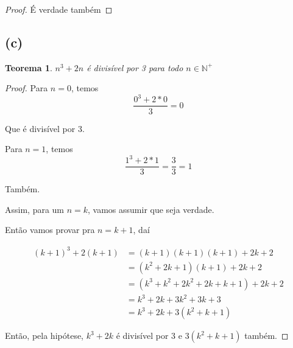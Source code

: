 \documentclass{article}
\begin{document}
\begin{proof}
	É verdade também
\end{proof}

\subsection*{(c)}
\newtheorem{teo3}{Teorema}
\begin{teo3}
	$n^3 + 2n$ é divisível por 3 para todo $n \in \mathbb{N^+}$
\end{teo3}
\begin{proof}
	Para $n = 0$, temos
	\begin{equation}
		\dfrac{0^3 + 2*0}{3} = 0
	\end{equation}

	Que é divisível por 3.

	Para $n = 1$, temos
	\begin{equation}
		\dfrac{1^3 + 2*1}{3} = \dfrac{3}{3} = 1
	\end{equation}

	Também.

	Assim, para um $n = k$, vamos assumir que seja verdade. 

	Então vamos provar pra $n = k + 1$, daí

	\begin{equation}
		\begin{split}
		(k+1)^3 + 2(k + 1) & = (k + 1)(k + 1)(k + 1) + 2k + 2\\
		& = (k^2 + 2k + 1)(k + 1) + 2k + 2\\
		& = (k^3 + k^2 + 2k^2 + 2k + k + 1) + 2k + 2\\
		& = k^3 + 2k + 3k^2 + 3k + 3\\
		& = k^3 + 2k + 3(k^2 + k + 1)
		\end{split}
	\end{equation}

	Então, pela hipótese, $k^3 + 2k$ é divisível por 3 e $3(k^2 + k + 1)$ também.
\end{proof}
\end{document}
